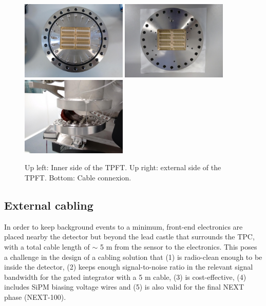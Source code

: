 \begin{figure}[h!]
\centering
\includegraphics[width=0.45\textwidth]{IMG/TPFT1}
\includegraphics[width=0.45\textwidth]{IMG/TPFT2}
\includegraphics[width=0.45\textwidth]{IMG/TPFT_connected}
\caption{Up left: Inner side of the TPFT. Up right: external side of the TPFT. Bottom: Cable connexion.}
\label{fig:TPFT}
\end{figure}



\subsection{External cabling}\label{sec:ext}
In order to keep background events to a minimum, front-end electronics are placed nearby the detector but beyond the lead castle that surrounds the TPC, with a total cable length of $\sim$ 5 m from the sensor to the electronics. This poses a challenge in the design of a cabling solution that (1) is radio-clean enough to be inside the detector, (2) keeps enough signal-to-noise ratio in the relevant signal bandwidth for the gated integrator with a 5 m cable, (3) is cost-effective, (4) includes SiPM biasing voltage wires and (5) is also valid for the final NEXT phase (NEXT-100).

